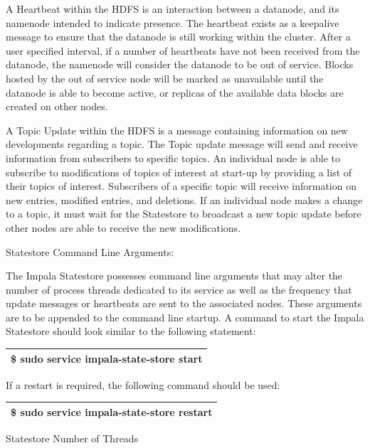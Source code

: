 \documentclass[onecolumn, draftclsnofoot,10pt, compsoc]{IEEEtran}
\begin{document}
A Heartbeat within the HDFS is an interaction between a datanode, and its namenode intended to indicate presence.
The heartbeat exists as a keepalive message to ensure that the datanode is still working within the cluster.
After a user specified interval, if a number of heartbeats have not been received from the datanode, the namenode will consider the datanode to be out of service. 
Blocks hosted by the out of service node will be marked as unavailable until the datanode is able to become active, or replicas of the available data blocks are created on other nodes.

A Topic Update within the HDFS is a message containing information on new developments regarding a topic.
The Topic update message will send and receive information from subscribers to specific topics. 
An individual node is able to subscribe to modifications of topics of interest at start-up by providing a list of their topics of interest. 
Subscribers of a specific topic will receive information on new entries, modified entries, and deletions. 
If an individual node makes a change to a topic, it must wait for the Statestore to broadcast a new topic update before other nodes are able to receive the new modifications. 

Statestore Command Line Arguments:

The Impala Statestore possesses command line arguments that may alter the number of process threads dedicated to its service as well as the frequency that update messages or heartbeats are sent to the associated nodes.
These arguments are to be appended to the command line startup.
A command to start the Impala Statestore should look similar to the following statement:
\begin{center}
\begin{tabular}{ |c| }
    \hline
    \$ sudo service impala-state-store start \\
    \hline
\end{tabular}
\end{center}

If a restart is required, the following command should be used:

\begin{center}
\begin{tabular}{ |c| }
    \hline
    \$ sudo service impala-state-store restart \\
    \hline
\end{tabular}
\end{center}

Statestore Number of Threads
\end{document}
